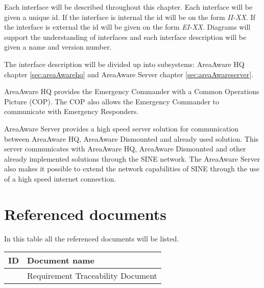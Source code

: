 Each interface will be described throughout this chapter. Each interface will be given a unique id. If the interface is internal the id will be on the form \emph{II-XX}. If the interface is external the id will be given on the form \emph{EI-XX}. Diagrams will support the understanding of interfaces and each interface description will be given a name and version number.

The interface description will be divided up into subsystems: AreaAware HQ chapter \ref{sec:areaAwarehq} and AreaAware Server chapter \ref{sec:areaAwareserver}.

AreaAware HQ provides the Emergency Commander with a Common Operations Picture (COP). The COP also allows the Emergency Commander to communicate with Emergency Responders.

AreaAware Server provides a high speed server solution for communication between AreaAware HQ, AreaAware Dismounted and already used solution. This server communicates with AreaAware HQ, AreaAware Dismounted and other already implemented solutions through the SINE network. The AreaAware Server also makes it possible to extend the network capabilities of SINE through the use of a high speed internet connection.

\section{Referenced documents}
In this table all the referenced documents will be listed.

\begin{tabular}{b{6cm} b{7cm}}
	\textbf{ID} & \textbf{Document name} \\
	\hline
	\rtm & Requirement Traceability Document \\
\end{tabular}
